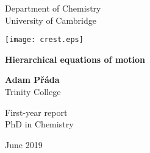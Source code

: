\begin{titlepage}
    \begin{center}
        \LARGE
        Department of Chemistry\\
        University of Cambridge\\
        \Huge
        
        \vspace{2cm}
        
        \texttt{[image: crest.eps]}
        
        \vspace{1cm}
        
        \textbf{Hierarchical equations of motion}
        
        \vspace{2cm}
        \LARGE
        \textbf{Adam P\v r\' ada}\\
        \vspace{0.8cm}
        \Large
        Trinity College\\
        \vspace{0.8cm}

		\vspace{0.8cm}
		First-year report\\
        PhD in Chemistry
        
        
        \vspace{0.8cm}

        June 2019
        
    \end{center}
\end{titlepage}